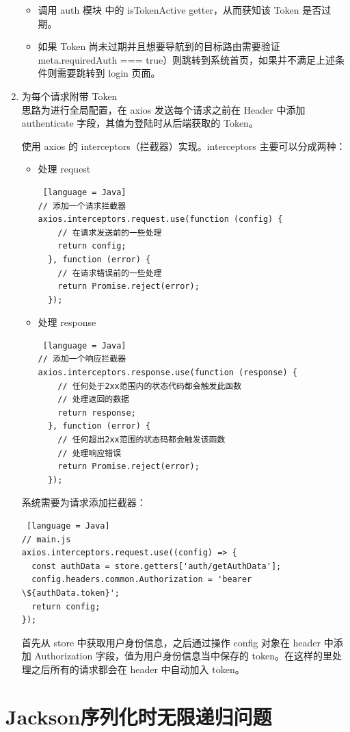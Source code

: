 \begin{enumerate}
\begin{itemize}
          \item 调用 auth 模块 中的 isTokenActive getter，从而获知该 Token 是否过期。
          \item 如果 Token 尚未过期并且想要导航到的目标路由需要验证\\meta.requiredAuth === true）则跳转到系统首页，如果并不满足上述条件则需要跳转到 login 页面。
        \end{itemize}
  \item 为每个请求附带 Token\\
        思路为进行全局配置，在 axios 发送每个请求之前在 Header 中添加 authenticate 字段，其值为登陆时从后端获取的 Token。

        使用 axios 的 interceptors（拦截器）实现。interceptors 主要可以分成两种：
        \begin{itemize}
          \item 处理 request
                \begin{lstlisting} [language = Java]
// 添加一个请求拦截器
axios.interceptors.request.use(function (config) {
    // 在请求发送前的一些处理
    return config;
  }, function (error) {
    // 在请求错误前的一些处理
    return Promise.reject(error);
  });

                \end{lstlisting}
          \item 处理 response
                \begin{lstlisting} [language = Java]
// 添加一个响应拦截器
axios.interceptors.response.use(function (response) {
    // 任何处于2xx范围内的状态代码都会触发此函数
    // 处理返回的数据
    return response;
  }, function (error) {
    // 任何超出2xx范围的状态码都会触发该函数
    // 处理响应错误
    return Promise.reject(error);
  });
\end{lstlisting}
        \end{itemize}
        系统需要为请求添加拦截器：
        \begin{lstlisting} [language = Java]
// main.js
axios.interceptors.request.use((config) => {
  const authData = store.getters['auth/getAuthData'];
  config.headers.common.Authorization = 'bearer \${authData.token}';
  return config;
});
    \end{lstlisting}
        首先从 store 中获取用户身份信息，之后通过操作 config 对象在 header 中添加 Authorization 字段，值为用户身份信息当中保存的 token。在这样的里处理之后所有的请求都会在 header 中自动加入 token。
\end{enumerate}

\section{Jackson序列化时无限递归问题}

